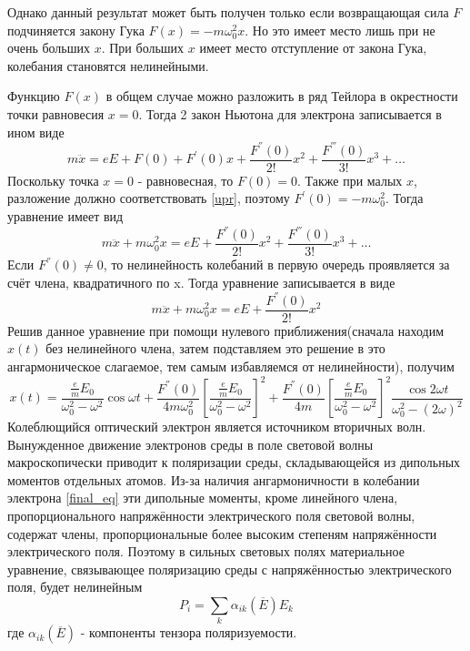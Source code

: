 \documentclass[a4paper,12pt]{article} %
\begin{document}
Однако данный результат может быть получен только если возвращающая сила $F$ подчиняется закону Гука $F(x) = -m \omega^2_0 x$. Но это имеет место лишь при не очень больших $x$. При больших $x$ имеет место отступление от закона Гука, колебания становятся нелинейными.

Функцию $F(x)$ в общем случае можно разложить в ряд Тейлора в окрестности точки равновесия $x=0$. Тогда 2 закон Ньютона для электрона записывается в ином виде
\begin{equation}
m \ddot{x} = eE + F(0) + F^{'}(0)x + \frac{F^{''}(0)}{2!}x^2 + \frac{F^{'''}(0)}{3!}x^3 + \ldots
\end{equation}
Поскольку точка $x = 0$ - равновесная, то $F(0) = 0$. Также при малых $x$, разложение должно соответствовать \eqref{upr}, поэтому $F^{'}(0) = -m \omega^2_0$. Тогда уравнение имеет вид
\begin{equation}
m \ddot{x} + m \omega^2_0 x = eE + \frac{F^{''}(0)}{2!}x^2 + \frac{F^{'''}(0)}{3!}x^3 + \ldots
\end{equation}
Если $F^{''}(0) \neq 0$, то нелинейность колебаний в первую очередь
проявляется за счёт члена, квадратичного по x. Тогда уравнение записывается в виде
\begin{equation}
m \ddot{x} + m \omega^2_0 x = eE + \frac{F^{''}(0)}{2!}x^2
\label{final_eq}
\end{equation}
Решив данное уравнение при помощи нулевого приближения(сначала находим $x(t)$ без нелинейного члена, затем подставляем это решение в это ангармоническое слагаемое, тем самым избавляемся от нелинейности), получим
\begin{equation}
x(t) = \frac{\frac{e}{m} E_0}{\omega^2_0 - \omega^2} \cos \omega t + \frac{F^{''}(0)}{4m\omega^2_0} \left[ \frac{\frac{e}{m} E_0}{\omega^2_0-\omega^2} \right]^2 + \frac{F^{''}(0)}{4m} \left[ \frac{\frac{e}{m} E_0}{\omega^2_0-\omega^2} \right]^2 \frac{\cos 2 \omega t}{\omega^2_0 - (2 \omega)^2}
\label{x}
\end{equation}
Колеблющийся оптический электрон является источником вторичных волн. Вынужденное движение электронов среды в поле световой волны макроскопически приводит к поляризации среды, складывающейся из дипольных моментов отдельных атомов. Из-за наличия ангармоничности в колебании электрона \eqref{final_eq} эти дипольные моменты, кроме линейного члена, пропорционального напряжённости электрического поля световой волны, содержат члены, пропорциональные более высоким степеням напряжённости электрического поля. Поэтому в сильных световых полях материальное уравнение, связывающее поляризацию среды с напряжённостью электрического поля, будет нелинейным
\begin{equation}
P_i = \sum_{k} \alpha_{ik}(\overline{E}) E_k
\end{equation}
где $\alpha_{ik}(\overline{E})$ - компоненты тензора поляризуемости.
\end{document}
